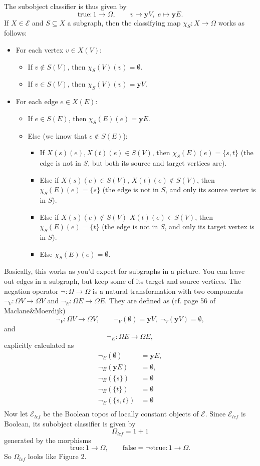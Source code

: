 The subobject classifier is thus given by
\[ \text{true} : 1 \to \Omega, \qquad v \mapsto \mathbf{y}V, \; e \mapsto \mathbf{y}E. \]
If $X \in \mathscr{E}$ and $S \subseteq X$ a subgraph, then the classifying map $\chi_S : X \to \Omega$ works as follows:
\begin{itemize}
	\item For each vertex $v \in X(V)$:
	\begin{itemize}
		\item If $v \not\in S(V)$, then $\chi_S(V)(v) = \emptyset$.
		\item If $v \in S(V)$, then $\chi_S(V)(v) = \mathbf{y}V$.
	\end{itemize}
	\item For each edge $e \in X(E)$:
	\begin{itemize}
		\item If $e \in S(E)$, then $\chi_S(E)(e) = \mathbf{y}E$.
		\item Else (we know that $e \not\in S(E)$):
		\begin{itemize}
			\item If $X(s)(e), X(t)(e) \in S(V)$, then $\chi_S(E)(e) = \{s,t\}$ (the edge is not in $S$, but both its source and target vertices are).
			\item Else if $X(s)(e) \in S(V)$, $X(t)(e) \not\in S(V)$, then $\chi_S(E)(e) = \{s\}$ (the edge is not in $S$, and only its source vertex is in $S$).
			\item Else if $X(s)(e) \not\in S(V)$ $X(t)(e) \in S(V)$, then $\chi_S(E)(e) = \{t\}$ (the edge is not in $S$, and only its target vertex is in $S$).
			\item Else $\chi_S(E)(e) = \emptyset$.
		\end{itemize}
	\end{itemize}
\end{itemize}
Basically, this works as you'd expect for subgraphs in a picture. You can leave out edges in a subgraph, but keep some of its target and source vertices.
The negation operator $\neg : \Omega \to \Omega$ is a natural transformation with two components $\neg_V : \Omega V \to \Omega V$ and $\neg_E : \Omega E \to \Omega E$. They are defined as (cf. page 56 of Maclane\&Moerdijk)
\[ \neg_V : \Omega V \to \Omega V, \qquad \neg_V(\emptyset) = \mathbf{y}V, \; \neg_V(\mathbf{y}V) = \emptyset, \]
and
\[ \neg_E : \Omega E \to \Omega E, \]
explicitly calculated as
\begin{align*}
\neg_E(\emptyset) &= \mathbf{y}E, \\
\neg_E(\mathbf{y}E) &= \emptyset, \\
\neg_E(\{s\}) &= \emptyset\\
\neg_E(\{t\}) &= \emptyset\\
\neg_E(\{s,t\}) &= \emptyset\\
\end{align*}
Now let $\mathscr{E}_{lcf}$ be the Boolean topos of locally constant objects of $\mathscr{E}$. Since $\mathscr{E}_{lcf}$ is Boolean, its subobject classifier is given by
\[ \Omega_{lcf} = 1 + 1 \]
generated by the morphisms
\[ \text{true} : 1 \to \Omega, \qquad \text{false} = \neg \circ \text{true} : 1 \to \Omega. \]
So $\Omega_{lcf}$ looks like Figure 2.


